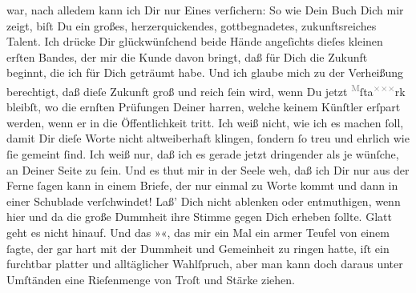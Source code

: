                war, nach alledem kann ich Dir nur Eines verſichern: So wie Dein Buch Dich mir zeigt, biſt Du ein großes,
               herzerquickendes, gottbegnadetes, zukunftsreiches Talent. Ich drücke Dir
               glückwünſchend beide Hände angeſichts dieſes kleinen erſten Bandes, der mir die Kunde davon bringt, daß
               für Dich die Zukunft beginnt, die ich für Dich geträumt habe. Und ich glaube mich zu
               der Verheißung berechtigt, daß dieſe Zukunft groß und reich{ }ſein wird, wenn Du jetzt
                  {\pb}\substVorne{}\textsuperscript{\textcolor{gray}{M}}\substDazwischen{}ſ\substHinten{}ta\substVorne{}\textsuperscript{\textcolor{gray}{×}\-\textcolor{gray}{×}\-\textcolor{gray}{×}}\substDazwischen{}rk\substHinten{} bleibſt, wo die ernſten Prüfungen Deiner harren, welche keinem Künſtler
               erſpart werden, wenn er in die Öffentlichkeit tritt. Ich weiß nicht, wie ich es
               machen{ }ſoll, damit Dir dieſe Worte nicht altweiberhaft klingen,{ }ſondern{ }ſo treu und
               ehrlich wie{ }ſie gemeint{ }ſind. Ich weiß nur, daß ich es gerade jetzt dringender als je
               wünſche, \strikeout{\textcolor{gray}{and}} an Deiner Seite zu{ }ſein. Und es thut mir in der Seele weh, daß ich Dir nur aus
               der Ferne{ }ſagen kann in einem Briefe, der nur einmal zu Worte kommt und dann in einer
               Schublade verſchwindet! {\pb}Laß’ Dich nicht ablenken
               oder entmuthigen, wenn hier und da die große Dummheit ihre Stimme gegen Dich erheben{ }ſollte\strikeout{\textcolor{gray}{n}}. Glatt geht es nicht hinauf. Und das »\label{K_L02703-1v}\label{K_L02703-1}«, das mir ein Mal ein armer Teufel von einem \label{K_L02703-2v}\label{K_L02703-2}{ }ſagte, der gar hart mit der
               Dummheit und Gemeinheit zu ringen hatte, iſt ein furchtbar platter und alltäglicher
               Wahlſpruch, aber man kann doch daraus unter Umſtänden eine Rieſenmenge von {\pb}Troſt und Stärke ziehen.\pend
           
